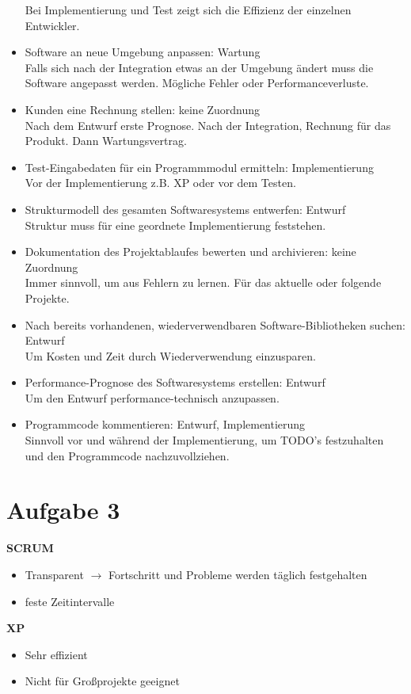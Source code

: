 \documentclass[a4paper,12pt]{article}
\newcommand{\aufgabe}[1]{\section*{Aufgabe #1}}
\begin{document}
\begin{itemize}
Bei Implementierung und Test zeigt sich die Effizienz der einzelnen Entwickler.
\item Software an neue Umgebung anpassen: Wartung\\
Falls sich nach der Integration etwas an der Umgebung ändert muss die Software angepasst werden. Mögliche Fehler oder Performanceverluste.
\item Kunden eine Rechnung stellen: keine Zuordnung\\
Nach dem Entwurf erste Prognose. Nach der Integration, Rechnung für das Produkt. Dann Wartungsvertrag.
\item Test-Eingabedaten für ein Programmmodul ermitteln: Implementierung\\
Vor der Implementierung z.B. XP oder vor dem Testen.
\item Strukturmodell des gesamten Softwaresystems entwerfen: Entwurf\\
Struktur muss für eine geordnete Implementierung feststehen.
\item Dokumentation des Projektablaufes bewerten und archivieren: keine Zuordnung\\
Immer sinnvoll, um aus Fehlern zu lernen. Für das aktuelle oder folgende Projekte.
\item Nach bereits vorhandenen, wiederverwendbaren Software-Bibliotheken suchen: Entwurf\\
Um Kosten und Zeit durch Wiederverwendung einzusparen.
\item Performance-Prognose des Softwaresystems erstellen: Entwurf\\
Um den Entwurf performance-technisch anzupassen.
\item Programmcode kommentieren: Entwurf, Implementierung\\
Sinnvoll vor und während der Implementierung, um TODO's festzuhalten und den Programmcode nachzuvollziehen.
\end{itemize}
\aufgabe{3}

\textbf{SCRUM}
\begin{itemize}
\item Transparent $\rightarrow$ Fortschritt und Probleme werden täglich festgehalten
\item feste Zeitintervalle
\end{itemize}
\textbf{XP}
\begin{itemize}
\item Sehr effizient
\item Nicht für Großprojekte geeignet
\end{itemize}
\end{document}

